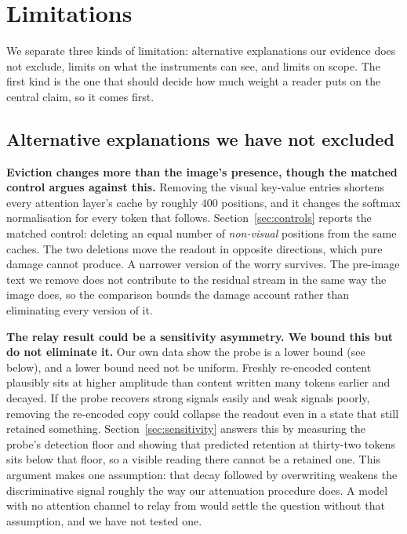 \documentclass{article}
\begin{document}
\section{Limitations}
\label{sec:limits}

We separate three kinds of limitation: alternative explanations our evidence
does not exclude, limits on what the instruments can see, and limits on scope.
The first kind is the one that should decide how much weight a reader puts on
the central claim, so it comes first.

\subsection{Alternative explanations we have not excluded}

\textbf{Eviction changes more than the image's presence, though the matched
control argues against this.} Removing the visual key-value entries shortens
every attention layer's cache by roughly 400 positions, and it changes the
softmax normalisation for every token that follows. Section~\ref{sec:controls}
reports the matched control: deleting an equal number of \emph{non-visual}
positions from the same caches. The two deletions move the readout in opposite
directions, which pure damage cannot produce. A narrower version of the worry
survives. The pre-image text we remove does not contribute to the residual
stream in the same way the image does, so the comparison bounds the damage
account rather than eliminating every version of it.

\textbf{The relay result could be a sensitivity asymmetry. We bound this but
do not eliminate it.} Our own data show the probe is a lower bound (see
below), and a lower bound need not be uniform. Freshly re-encoded content
plausibly sits at higher amplitude than content written many tokens earlier
and decayed. If the probe recovers strong signals easily and weak signals
poorly, removing the re-encoded copy could collapse the readout even in a
state that still retained something. Section~\ref{sec:sensitivity} answers
this by measuring the probe's detection floor and showing that predicted
retention at thirty-two tokens sits below that floor, so a visible reading
there cannot be a retained one. This argument makes one assumption: that
decay followed by overwriting weakens the discriminative signal roughly the
way our attenuation procedure does. A model with no attention channel to
relay from would settle the question without that assumption, and we have not
tested one.
\end{document}
